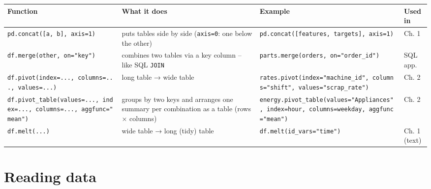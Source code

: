\documentclass[
  letterpaper,
  DIV=11,
  numbers=noendperiod]{scrreprt}
\begin{document}
\begin{longtable}[]{@{}
  >{\raggedright\arraybackslash}p{}
  >{\raggedright\arraybackslash}p{}
  >{\raggedright\arraybackslash}p{}
  >{\raggedright\arraybackslash}p{}@{}}
\toprule\noalign{}
\begin{minipage}[b]{\linewidth}\raggedright
Function
\end{minipage} & \begin{minipage}[b]{\linewidth}\raggedright
What it does
\end{minipage} & \begin{minipage}[b]{\linewidth}\raggedright
Example
\end{minipage} & \begin{minipage}[b]{\linewidth}\raggedright
Used in
\end{minipage} \\
\midrule\noalign{}
\endhead
\bottomrule\noalign{}
\endlastfoot
\texttt{pd.concat({[}a,\ b{]},\ axis=1)} & puts tables side by side
(\texttt{axis=0}: one below the other) &
\texttt{pd.concat({[}features,\ targets{]},\ axis=1)} & Ch. 1 \\
\texttt{df.merge(other,\ on="key")} & combines two tables via a key
column -- like SQL \texttt{JOIN} &
\texttt{parts.merge(orders,\ on="order\_id")} & SQL app. \\
\texttt{df.pivot(index=...,\ columns=...,\ values=...)} & long table →
wide table &
\texttt{rates.pivot(index="machine\_id",\ columns="shift",\ values="scrap\_rate")}
& Ch. 2 \\
\texttt{df.pivot\_table(values=...,\ index=...,\ columns=...,\ aggfunc="mean")}
& groups by two keys and arranges one summary per combination as a table
(rows × columns) &
\texttt{energy.pivot\_table(values="Appliances",\ index=hour,\ columns=weekday,\ aggfunc="mean")}
& Ch. 2 \\
\texttt{df.melt(...)} & wide table → long (tidy) table &
\texttt{df.melt(id\_vars="time")} & Ch. 1 (text) \\
\end{longtable}

\section{Reading data}\label{reading-data}
\end{document}
